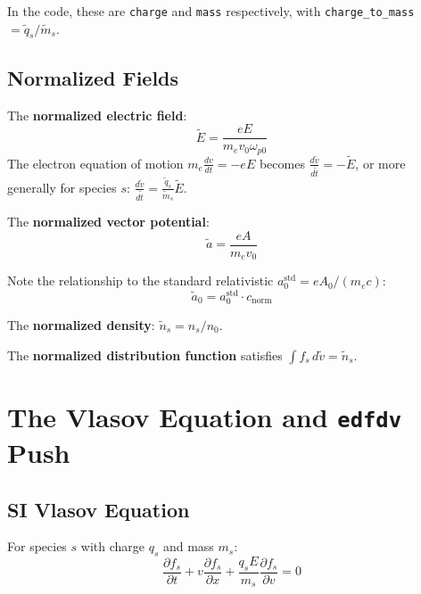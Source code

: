\documentclass[11pt]{article}
\newcommand{\tl}[1]{\tilde{#1}}
\newcommand{\cnorm}{c_{\text{norm}}}
\newcommand{\wpz}{\omega_{p0}}
\newcommand{\code}[1]{\texttt{#1}}
\newcommand{\tq}{\tl{q}}
\newcommand{\tm}{\tl{m}}
\begin{document}
In the code, these are \code{charge} and \code{mass} respectively, with \code{charge\_to\_mass}~$= \tq_s/\tm_s$.

\subsection{Normalized Fields}

The \textbf{normalized electric field}:
\begin{equation}
    \boxed{\tl{E} = \frac{eE}{m_e v_0 \wpz}}
    \label{eq:E-norm}
\end{equation}
The electron equation of motion $m_e \frac{dv}{dt} = -eE$ becomes $\frac{d\tl{v}}{d\tl{t}} = -\tl{E}$, or more generally for species $s$: $\frac{d\tl{v}}{d\tl{t}} = \frac{\tq_s}{\tm_s} \tl{E}$.

The \textbf{normalized vector potential}:
\begin{equation}
    \boxed{\tl{a} = \frac{eA}{m_e v_0}}
    \label{eq:a-norm}
\end{equation}

Note the relationship to the standard relativistic $a_0^{\text{std}} = eA_0/(m_e c)$:
\begin{equation}
    \tl{a}_0 = a_0^{\text{std}} \cdot \cnorm
\end{equation}

The \textbf{normalized density}: $\tl{n}_s = n_s / n_0$.

The \textbf{normalized distribution function} satisfies $\int f_s \, d\tl{v} = \tl{n}_s$.

\newpage
\section{The Vlasov Equation and \code{edfdv} Push}
\label{sec:vlasov}

\subsection{SI Vlasov Equation}

For species $s$ with charge $q_s$ and mass $m_s$:
\begin{equation}
    \frac{\partial f_s}{\partial t} + v \frac{\partial f_s}{\partial x} + \frac{q_s E}{m_s} \frac{\partial f_s}{\partial v} = 0
\end{equation}
\end{document}
